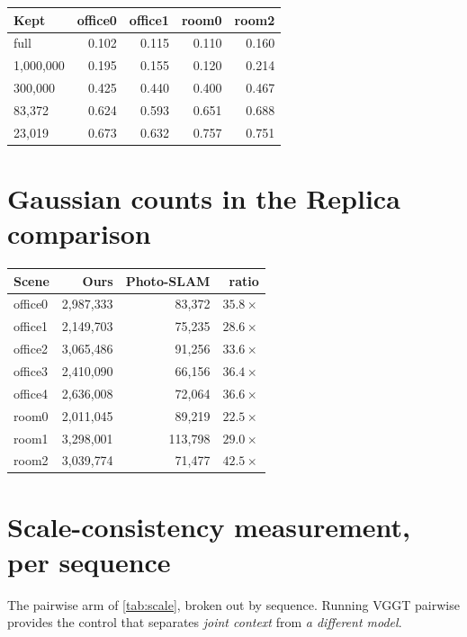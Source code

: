 \begin{center}
\small
\begin{tabular}{@{}lrrrr@{}}
\toprule
Kept & office0 & office1 & room0 & room2 \\
\midrule
full        & 0.102 & 0.115 & 0.110 & 0.160 \\
1{,}000{,}000 & 0.195 & 0.155 & 0.120 & 0.214 \\
300{,}000     & 0.425 & 0.440 & 0.400 & 0.467 \\
83{,}372      & 0.624 & 0.593 & 0.651 & 0.688 \\
23{,}019      & 0.673 & 0.632 & 0.757 & 0.751 \\
\bottomrule
\end{tabular}
\end{center}

\section{Gaussian counts in the Replica comparison}

\begin{center}
\small
\begin{tabular}{@{}lrrr@{}}
\toprule
Scene & Ours & Photo-SLAM & ratio \\
\midrule
office0 & 2{,}987{,}333 & 83{,}372  & $35.8\times$ \\
office1 & 2{,}149{,}703 & 75{,}235  & $28.6\times$ \\
office2 & 3{,}065{,}486 & 91{,}256  & $33.6\times$ \\
office3 & 2{,}410{,}090 & 66{,}156  & $36.4\times$ \\
office4 & 2{,}636{,}008 & 72{,}064  & $36.6\times$ \\
room0   & 2{,}011{,}045 & 89{,}219  & $22.5\times$ \\
room1   & 3{,}298{,}001 & 113{,}798 & $29.0\times$ \\
room2   & 3{,}039{,}774 & 71{,}477  & $42.5\times$ \\
\bottomrule
\end{tabular}
\end{center}

\section{Scale-consistency measurement, per sequence}

The pairwise arm of \cref{tab:scale}, broken out by sequence. Running
VGGT pairwise provides the control that separates \emph{joint context}
from \emph{a different model}.

